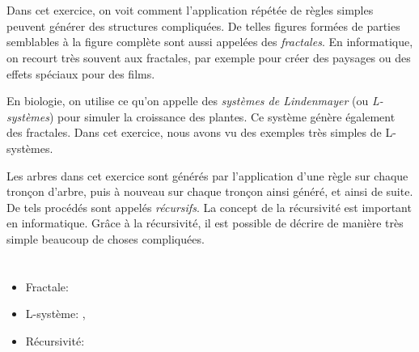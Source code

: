 {{%
\section*{\BrochureItsInformatics}
Dans cet exercice, on voit comment l’application répétée de règles simples peuvent générer des structures compliquées. De telles figures formées de parties semblables à la figure complète sont aussi appelées des \emph{fractales}. En informatique, on recourt très souvent aux fractales, par exemple pour créer des paysages ou des effets spéciaux pour des films.

En biologie, on utilise ce qu’on appelle des \emph{systèmes de Lindenmayer} (ou \emph{L-systèmes}) pour simuler la croissance des plantes. Ce système génère également des fractales. Dans cet exercice, nous avons vu des exemples très simples de L-systèmes.

Les arbres dans cet exercice sont générés par l’application d’une règle sur chaque tronçon d’arbre, puis à nouveau sur chaque tronçon ainsi généré, et ainsi de suite. De tels procédés sont appelés \emph{récursifs}. La concept de la récursivité est important en informatique. Grâce à la récursivité, il est possible de décrire de manière très simple beaucoup de choses compliquées.



\section*{\BrochureWebsitesAndKeywords}
{\raggedright
\begin{itemize}
  \item Fractale: \href{https://fr.wikipedia.org/wiki/Fractale}{}
  \item L-système: \href{https://fr.wikipedia.org/wiki/L-Syst\%C3\%A8me}{}, \href{http://paulbourke.net/fractals/lsys/}{}
  \item Récursivité: \href{https://fr.wikipedia.org/wiki/R\%C3\%A9cursivit\%C3\%A9}{}
\end{itemize}


}

}{}

}
